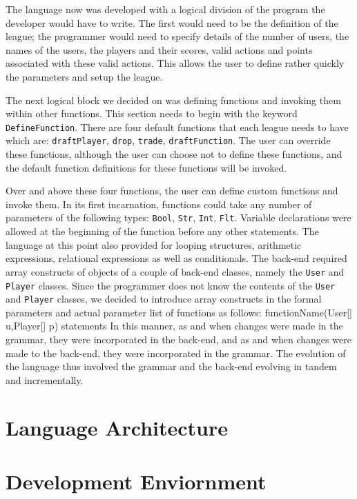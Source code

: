 \documentclass[12pt]{report}
\begin{document}
The language now was developed with a logical division of the program the developer would have to write. The first would need to be the definition of the league; the programmer would need to specify details of the number of users, the names of the users, the players and their scores, valid actions and points associated with these valid actions. This allows the user to define rather quickly the parameters and setup the league.

The next logical block we decided on was defining functions and invoking them within other functions. This section needs to begin with the keyword \texttt{DefineFunction}. There are four default functions that each league needs to have which are: \texttt{draftPlayer}, \texttt{drop}, \texttt{trade}, \texttt{draftFunction}. The user can override these functions, although the user can choose not to define these functions, and the default function definitions for these functions will be invoked. 

Over and above these four functions, the user can define custom functions and invoke them. In its first incarnation, functions could take any number of parameters of the following types: \texttt{Bool}, \texttt{Str}, \texttt{Int}, \texttt{Flt}. Variable declarations were allowed at the beginning of the function before any other statements. The language at this point also provided for looping structures, arithmetic expressions, relational expressions as well as conditionals. The back-end required array constructs of objects of a couple of back-end classes, namely the \texttt{User} and \texttt{Player} classes. Since the programmer does not know the contents of the \texttt{User} and \texttt{Player} classes, we decided to introduce array constructs in the formal parameters and actual parameter list of functions as follows:
      	functionName(User[] u,Player[] p){ statements }
In this manner, as and when changes were made in the grammar, they were incorporated in the back-end, and as and when changes were made to the back-end, they were incorporated in the grammar. The evolution of the language thus involved the grammar and the back-end evolving in tandem and incrementally.

\chapter{Language Architecture}

\chapter{Development Enviornment}
\end{document}

